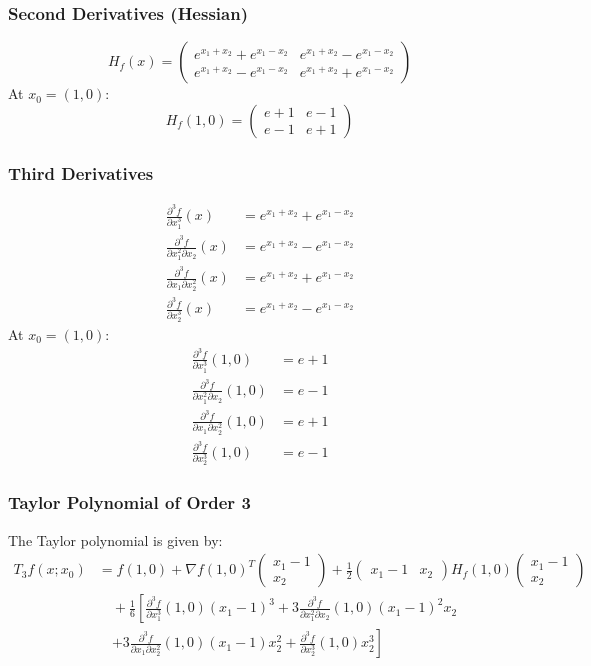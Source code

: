 \documentclass{article}
\begin{document}
\subsubsection*{Second Derivatives (Hessian)}
\[ H_f(x) = 
\begin{pmatrix}
e^{x_1+x_2} + e^{x_1-x_2} & e^{x_1+x_2} - e^{x_1-x_2} \\
e^{x_1+x_2} - e^{x_1-x_2} & e^{x_1+x_2} + e^{x_1-x_2}
\end{pmatrix}
\]
At \( x_0 = (1,0) \):
\[ H_f(1,0) = 
\begin{pmatrix}
e + 1 & e - 1 \\
e - 1 & e + 1
\end{pmatrix}
\]

\subsubsection*{Third Derivatives}
\begin{align*}
\frac{\partial^3 f}{\partial x_1^3}(x) &= e^{x_1+x_2} + e^{x_1-x_2} \\
\frac{\partial^3 f}{\partial x_1^2 \partial x_2}(x) &= e^{x_1+x_2} - e^{x_1-x_2} \\
\frac{\partial^3 f}{\partial x_1 \partial x_2^2}(x) &= e^{x_1+x_2} + e^{x_1-x_2} \\
\frac{\partial^3 f}{\partial x_2^3}(x) &= e^{x_1+x_2} - e^{x_1-x_2}
\end{align*}
At \( x_0 = (1,0) \):
\begin{align*}
\frac{\partial^3 f}{\partial x_1^3}(1,0) &= e + 1 \\
\frac{\partial^3 f}{\partial x_1^2 \partial x_2}(1,0) &= e - 1 \\
\frac{\partial^3 f}{\partial x_1 \partial x_2^2}(1,0) &= e + 1 \\
\frac{\partial^3 f}{\partial x_2^3}(1,0) &= e - 1
\end{align*}

\subsubsection*{Taylor Polynomial of Order 3}
The Taylor polynomial is given by:
\begin{align*}
T_3f(x; x_0) &= f(1,0) + \nabla f(1,0)^T \begin{pmatrix} x_1-1 \\ x_2 \end{pmatrix} + \frac{1}{2} \begin{pmatrix} x_1-1 & x_2 \end{pmatrix} H_f(1,0) \begin{pmatrix} x_1-1 \\ x_2 \end{pmatrix} \\
&\quad + \frac{1}{6} \left[ \frac{\partial^3 f}{\partial x_1^3}(1,0)(x_1-1)^3 + 3\frac{\partial^3 f}{\partial x_1^2 \partial x_2}(1,0)(x_1-1)^2x_2 \right. \\
&\quad \left. + 3\frac{\partial^3 f}{\partial x_1 \partial x_2^2}(1,0)(x_1-1)x_2^2 + \frac{\partial^3 f}{\partial x_2^3}(1,0)x_2^3 \right]
\end{align*}
\end{document}
